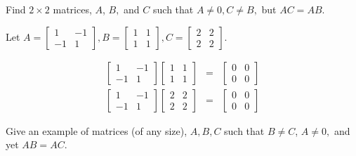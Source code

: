 \documentclass{ximera}
\begin{document}
\begin{problem}\label{prb:4.16} Find $2\times 2$ matrices, $A$, $B,$ and $C$ such that $A\neq 0,C\neq B,$
but $AC=AB.$
\begin{hint}
Let $A = \left[
\begin{array}{rr}
1 & -1 \\
-1 & 1
\end{array}
\right], B = \left[
\begin{array}{cc}
1 & 1 \\
1 & 1
\end{array}
\right], C = \left[
\begin{array}{cc}
2 & 2 \\
2 & 2
\end{array}
\right]$.

\begin{eqnarray*}
\left[
\begin{array}{rr}
1 & -1 \\
-1 & 1
\end{array}
\right] \left[
\begin{array}{cc}
1 & 1 \\
1 & 1
\end{array}
\right]  &=& \left[
\begin{array}{cc}
0 & 0 \\
0 & 0
\end{array}
\right] \\
 \left[
\begin{array}{rr}
1 & -1 \\
-1 & 1
\end{array}
\right] \left[
\begin{array}{cc}
2 & 2 \\
2 & 2
\end{array}
\right] &=& \left[
\begin{array}{cc}
0 & 0 \\
0 & 0
\end{array}
\right]
\end{eqnarray*}
\end{hint}
\end{problem}

\begin{problem}\label{prb:4.17} Give an example of matrices (of any size), $A,B,C$ such that $B\neq C$, $A\neq 0,$
and yet $AB=AC.$
\end{problem}
\end{document}

